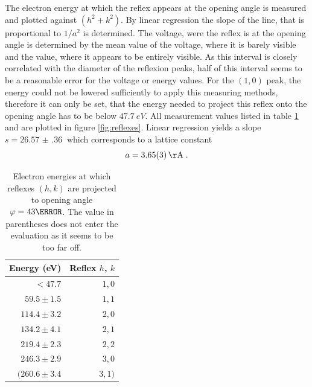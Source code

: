 \documentclass[a4paper]{scrartcl}
\numberwithin{equation}{section}
\numberwithin{figure}{section}
\numberwithin{table}{section}
\newcommand{\eq}[2]{\begin{equation}#1\label{#2}\end{equation}}
\begin{document}
The electron energy at which the reflex appears at the opening angle is measured and plotted against $(h^2+k^2)$. By linear regression the slope   of the line, that is proportional to $ 1/a^2 $  is determined. The voltage, were the reflex is at the opening angle is determined by the mean value of the voltage, where it is barely visible and the value, where it appears to be entirely visible. As this interval is closely correlated with the diameter of the reflexion peaks, half of this interval seems to be a reasonable error for the voltage or energy  values. For the $(1,0)$ peak, the energy could not be lowered sufficiently to apply this measuring methods, therefore it can only be set, that the energy needed to project this reflex onto the opening angle has to be below $\SI{47.7}{eV}$. All measurement values listed in table \ref{tab:reflexes} and are plotted in figure \ref{fig:reflexes}. Linear regression yields a slope $s=\SI{26.57(36)}{}$ which corresponds to a lattice constant 
\eq{a=\SI{3.65(3)}{\AA}\;.}{a1}
\begin{table}
\centering
\begin{tabular}{rr}
\toprule
Energy (eV) & Reflex $h$, $k$ \\
\midrule
$< 47.7$ & $1, 0$ \\ 
$59.5 \pm 1.5$ &  $1, 1$\\
$114.4 \pm 3.2$  & $2, 0$\\
$134.2 \pm 4.1 $ & $2, 1$ \\
$219.4 \pm 2.3$ & $2, 2$ \\
$246.3 \pm 2.9 $& $3, 0$ \\
$(260.6 \pm 3.4$ & $3,1) $ \\
\bottomrule
\end{tabular}
\caption{\small Electron energies at which reflexes $(h,k)$ are projected to opening angle $\varphi=43 \degree$. The value in parentheses does not enter the evaluation as it seems to be too far off.}
\label{tab:reflexes}
\end{table}



 

\end{document}
